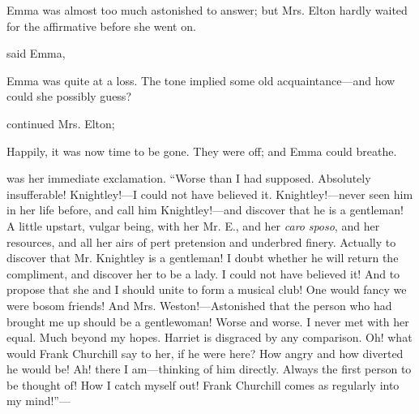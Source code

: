 Emma was almost too much astonished to answer; but Mrs. Elton hardly waited for the affirmative before she went on.


 said Emma, 


Emma was quite at a loss. The tone implied some old acquaintance---and how could she possibly guess?

 continued Mrs. Elton; 

Happily, it was now time to be gone. They were off; and Emma could breathe.

 was her immediate exclamation. “Worse than I had supposed. Absolutely insufferable! Knightley!---I could not have believed it. Knightley!---never seen him in her life before, and call him Knightley!---and discover that he is a gentleman! A little upstart, vulgar being, with her Mr. E., and her {\em caro} {\em sposo}, and her resources, and all her airs of pert pretension and underbred finery. Actually to discover that Mr. Knightley is a gentleman! I doubt whether he will return the compliment, and discover her to be a lady. I could not have believed it! And to propose that she and I should unite to form a musical club! One would fancy we were bosom friends! And Mrs. Weston!---Astonished that the person who had brought me up should be a gentlewoman! Worse and worse. I never met with her equal. Much beyond my hopes. Harriet is disgraced by any comparison. Oh! what would Frank Churchill say to her, if he were here? How angry and how diverted he would be! Ah! there I am---thinking of him directly. Always the first person to be thought of! How I catch myself out! Frank Churchill comes as regularly into my mind!”---

